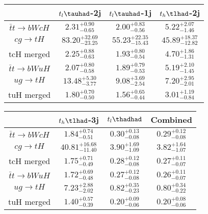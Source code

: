 \centering
\begin{tabular}{|c|c|c|c|} \hline
 & $t_l\tauhad$-2j & $t_l\tauhad$-1j & $t_h\tlhad$-2j\\\hline
$\bar{t}t\to bWcH$ & $2.31^{+0.90}_{-0.65}$ & $2.00^{+0.83}_{-0.56}$ & $5.22^{+2.07}_{-1.46}$\\\hline
$cg\to tH$ & $83.20^{+32.69}_{-23.25}$ & $55.23^{+22.35}_{-15.43}$ & $45.89^{+18.37}_{-12.82}$\\\hline
tcH merged & $2.25^{+0.88}_{-0.63}$ & $1.93^{+0.80}_{-0.54}$ & $4.70^{+1.86}_{-1.31}$\\\hline
$\bar{t}t\to bWuH$ & $2.07^{+0.80}_{-0.58}$ & $1.89^{+0.79}_{-0.53}$ & $5.19^{+2.10}_{-1.45}$\\\hline
$ug\to tH$ & $13.48^{+5.30}_{-3.77}$ & $9.08^{+3.69}_{-2.54}$ & $7.20^{+2.95}_{-2.01}$\\\hline
tuH merged & $1.80^{+0.70}_{-0.50}$ & $1.56^{+0.65}_{-0.44}$ & $3.01^{+1.19}_{-0.84}$\\\hline
\end{tabular}
\begin{tabular}{|c|c|c|c|} \hline
 & $t_h\tlhad$-3j & $t_l\thadhad$ & Combined\\\hline
$\bar{t}t\to bWcH$ & $1.84^{+0.74}_{-0.51}$ & $0.30^{+0.13}_{-0.08}$ & $0.29^{+0.12}_{-0.08}$\\\hline
$cg\to tH$ & $40.81^{+16.68}_{-11.40}$ & $3.90^{+1.69}_{-1.09}$ & $3.82^{+1.64}_{-1.07}$\\\hline
tcH merged & $1.75^{+0.71}_{-0.49}$ & $0.28^{+0.12}_{-0.08}$ & $0.27^{+0.11}_{-0.07}$\\\hline
$\bar{t}t\to bWuH$ & $1.72^{+0.69}_{-0.48}$ & $0.27^{+0.12}_{-0.08}$ & $0.26^{+0.11}_{-0.07}$\\\hline
$ug\to tH$ & $7.23^{+2.88}_{-2.02}$ & $0.82^{+0.35}_{-0.23}$ & $0.80^{+0.34}_{-0.22}$\\\hline
tuH merged & $1.40^{+0.57}_{-0.39}$ & $0.20^{+0.09}_{-0.06}$ & $0.20^{+0.08}_{-0.06}$\\\hline
\end{tabular}
